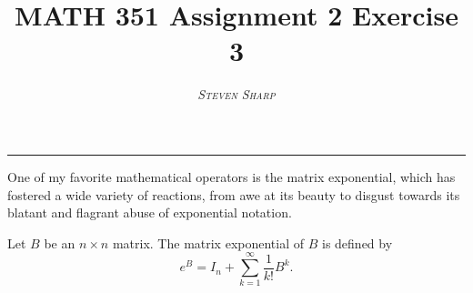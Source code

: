 \documentclass[10pt]{article}
\title{MATH 351 Assignment 2 Exercise 3}
\author{\textsc{\textit{Steven Sharp}}}
\date{}
\begin{document}
\maketitle

\thispagestyle{empty}

\begin{center}
\rule{\textwidth}{0.5pt}
\end{center}

One of my favorite mathematical operators is the matrix exponential, which has fostered a wide variety of reactions, from awe at its beauty to disgust towards its blatant and flagrant abuse of exponential notation.

Let $B$ be an $n\times n$ matrix. The matrix exponential of $B$ is defined by
\begin{equation}
e^B = I_n + \sum_{k=1}^\infty \frac{1}{k!} B^k.
\end{equation}
\end{document}
